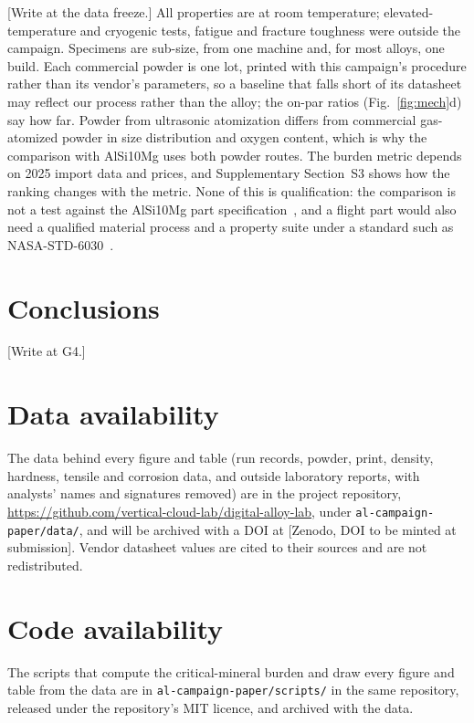 \documentclass[preprint,12pt]{elsarticle}
\newcommand{\placeholder}[1]{\textcolor{red!75!black}{[#1]}}
\newcommand{\AlSi}{AlSi10Mg\xspace}
\begin{document}
\placeholder{Write at the data freeze.} All properties are at room temperature; elevated-temperature and cryogenic tests, fatigue and fracture toughness were outside the campaign. Specimens are sub-size, from one machine and, for most alloys, one build. Each commercial powder is one lot, printed with this campaign's procedure rather than its vendor's parameters, so a baseline that falls short of its datasheet may reflect our process rather than the alloy; the on-par ratios (Fig.~\ref{fig:mech}d) say how far. Powder from ultrasonic atomization differs from commercial gas-atomized powder in size distribution and oxygen content, which is why the comparison with \AlSi uses both powder routes. The burden metric depends on 2025 import data and prices, and Supplementary Section~S3 shows how the ranking changes with the metric. None of this is qualification: the comparison is not a test against the \AlSi part specification~\cite{astm_f3318}, and a flight part would also need a qualified material process and a property suite under a standard such as NASA-STD-6030~\cite{nasa6030}.

\section{Conclusions}
\placeholder{Write at G4.}

\section*{Data availability}
\sloppy
The data behind every figure and table (run records, powder, print, density, hardness, tensile and corrosion data, and outside laboratory reports, with analysts' names and signatures removed) are in the project repository, \url{https://github.com/vertical-cloud-lab/digital-alloy-lab}, under \nolinkurl{al-campaign-paper/data/}, and will be archived with a DOI at \placeholder{Zenodo, DOI to be minted at submission}. Vendor datasheet values are cited to their sources and are not redistributed.

\section*{Code availability}
The scripts that compute the critical-mineral burden and draw every figure and table from the data are in \nolinkurl{al-campaign-paper/scripts/} in the same repository, released under the repository's MIT licence, and archived with the data.
\end{document}
